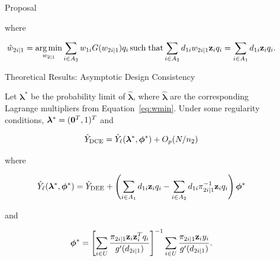 \documentclass[final]{beamer}
\DeclareMathOperator*{\argmin}{arg\,min}
\DeclareMathOperator*{\suchthat}{such\; that}
\newlength{\sepwidth}
\newlength{\colwidth}
\newcommand{\separatorcolumn}{\begin{column}{\sepwidth}\end{column}}
\begin{document}
\begin{frame}[t]
\begin{columns}[t]
\begin{column}{\colwidth}
\begin{alertblock}{Proposal}
    \vspace{-1.0cm}

    where 
    \vspace{-0.5cm}

    \begin{equation}\label{eq:wmin}
    \hat w_{2i|1} = \argmin_{w_{2|1}} \sum_{i \in A_2} w_{1i} G(w_{2i|1}) q_i
    \suchthat \sum_{i \in A_2} d_{1i} w_{2i|1} {\bf{z}}_i q_i = 
    \sum_{i \in A_1} d_{1i} {\bf{z}}_i q_i.
    \end{equation}
    
    \vspace{-0.5cm}
  \end{alertblock}

  \begin{exampleblock}{Theoretical Results: Asymptotic Design Consistency}

    Let $\bm \lambda^*$ be the probability limit of $\hat{\bm \lambda}$,
    where $\hat{\bm \lambda}$ are the corresponding Lagrange multipliers from
    Equation~\ref{eq:wmin}.
    Under some regularity conditions, $\bm \lambda^* = ({\bf 0}^T, 1)^T$ and

    $$\hat Y_{\rm{DCE}} = \hat Y_\ell(\bm \lambda^*, \bm \phi^*) + O_p(N / n_2)$$

    where
    \vspace{-1.3cm}

    $$\hat Y_{\ell}(\bm \lambda^*, \bm \phi^*) = \hat Y_{\rm{DEE}}+ 
    \left(\sum_{i \in A_1} d_{1i} {\bf z}_i q_i - \sum_{i \in A_2} d_{1i} 
    \pi_{2i \mid 1}^{-1}  {\bf z}_i q_i\right)\bm \phi^*$$

    \vspace{-1.3cm}
    and
    \vspace{-0.3cm}

    $$
    \bm \phi^* = 
    \left[\sum_{i \in U} \frac{\pi_{2i|1}{\bf z}_i {\bf z}_i^T q_i}{g'(d_{2i|1})}\right]^{-1}
    \sum_{i \in U} \frac{\pi_{2i|1}{\bf z}_i y_i}{g'(d_{2i|1})}.
    $$

    \vspace{-0.5cm}

  \end{exampleblock}

\end{column}

\separatorcolumn

\begin{column}{\colwidth}


\end{column}
\end{columns}
\end{frame}
\end{document}
